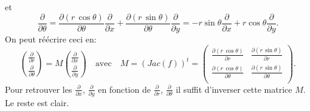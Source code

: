 {{et
$$\frac{\partial }{\partial \theta}= \frac{\partial (r\, \cos \theta)}{\partial \theta}\frac{\partial }{\partial x}+
\frac{\partial (r\, \sin \theta)}{\partial \theta}\frac{\partial }{\partial y}=
-r\sin  \theta \frac{\partial }{\partial x} + r \cos \theta \frac{\partial }{\partial y}.$$
On peut r\'e\'ecrire ceci en:
$$\binom{\frac{\partial }{\partial r}}{\frac{\partial }{\partial \theta}}=M \binom{\frac{\partial }{\partial x}}{\frac{\partial }{\partial y}}
\quad \text{avec} \quad M= (Jac(f))^t = \left(
                                   \begin{array}{cc}
                                     \frac{\partial (r\, \cos \theta)}{\partial r} & \frac{\partial (r\, \sin \theta)}{\partial r} \\
                                     \frac{\partial (r\, \cos \theta)}{\partial \theta} & \frac{\partial (r\, \sin \theta)}{\partial \theta} \\
                                   \end{array}
                                 \right) .$$
Pour retrouver les $\frac{\partial }{\partial x}$, $\frac{\partial }{\partial y}$ en fonction de $\frac{\partial }{\partial r}$, $\frac{\partial }{\partial \theta}$
il suffit d'inverser cette matrice $M$. Le reste est clair.}
}